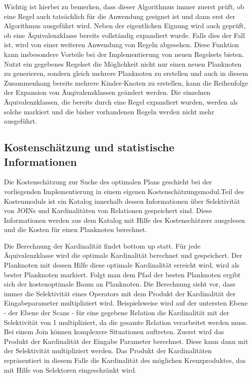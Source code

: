 Wichtig ist hierbei zu bemerken, dass dieser Algorithmus immer zuerst prüft, ob eine Regel auch tatsächlich für die Anwendung geeignet ist und dann erst der Algorithmus ausgeführt wird. Neben der eigentlichen Eignung wird auch geprüft, ob eine Äquivalenzklasse bereits vollständig expandiert wurde. Falls dies der Fall ist, wird von einer weiteren Anwendung von Regeln abgesehen. Diese Funktion kann insbesondere Vorteile bei der Implementierung von neuen Regelsets bieten. Nutzt ein gegebenes Regelset die Möglichkeit nicht nur einen neuen Planknoten zu generieren, sondern gleich mehrere Planknoten zu erstellen und auch in diesem Zusammenhang bereits mehrere Kinder-Knoten zu erstellen, kann die Reihenfolge der Expansion von Äuqivalenzklassen geändert werden. Die einzelnen Äquivalenzklassen, die bereits durch eine Regel expandiert wurden, werden als solche markiert und die bisher vorhandenen Regeln werden nicht mehr ausgeführt.



















\subsection{Kostenschätzung und statistische Informationen}



Die Kostenschätzung zur Suche des optimalen Plans geschieht bei der vorliegenden Implementierung in einem eigenen Kostenschätzungsmodul.Teil des Kostenmoduls ist ein Katalog innerhalb dessen Informationen über Selektivität von JOINs und Kardinalitäten von Relationen gespeichert sind. Diese Informationen werden aus dem Katalog mit Hilfe des Kostenschätzers ausgelesen und die Kosten für einen Planknoten berechnet.

Die Berechnung der Kardinalität findet bottom up statt. Für jede Äquivalenzklasse wird die optimale Kardinalität berechnet und gespeichert. Der Planknoten mit dessen Hilfe diese optimale Kardinalität erreicht wird, wird als bester Planknoten markiert. Folgt man dem Pfad der besten Planknoten ergibt sich der kostenoptimale Baum an Planknoten. Die Berechnung sieht vor, dass immer die Selektivität eines Operators mit dem Produkt der Kardinalität der Eingabeparameter multipliziert wird. Beispielsweise wird auf der untersten Ebene - der Ebene der Scans - für eine gegebene Relation die Kardinalität mit der Selektivität von 1 multipliziert, da die gesamte Relation verarbeitet werden muss. Bei einem Join können komplexere Situationen auftreten. Zuerst wird das Produkt der Kardinalität der Eingabe Parameter berechnet. Diese kann dann mit der 
Selektivität multipliziert werden. Das Produkt der Kardinalitäten repräsentiert in diesem Falle die Kardinalität des möglichen Kreuzproduktes, das mit Hilfe von Selektoren eingeschränkt wird.

